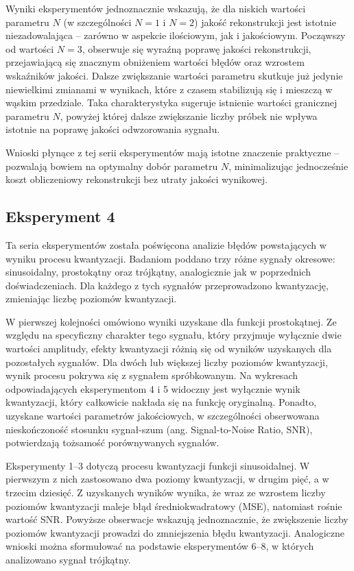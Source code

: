 \documentclass{article}
\begin{document}
    Wyniki eksperymentów jednoznacznie wskazują, że dla niskich wartości parametru \(N\) (w 
    szczególności \(N = 1\) i \(N = 2\)) jakość rekonstrukcji jest istotnie niezadowalająca 
    – zarówno w aspekcie ilościowym, jak i jakościowym. Począwszy od wartości 
    \(N = 3\), obserwuje się wyraźną poprawę jakości rekonstrukcji, przejawiającą się znacznym 
    obniżeniem wartości błędów oraz wzrostem wskaźników jakości. Dalsze zwiększanie wartości 
    parametru skutkuje już jedynie niewielkimi zmianami w wynikach, które z czasem stabilizują się 
    i mieszczą w wąskim przedziale. Taka charakterystyka sugeruje istnienie wartości granicznej parametru 
    \(N\), powyżej której dalsze zwiększanie liczby próbek nie wpływa istotnie 
    na poprawę jakości odwzorowania sygnału.

    Wnioski płynące z tej serii eksperymentów mają istotne znaczenie praktyczne – pozwalają 
    bowiem na optymalny dobór parametru 
    \(N\), minimalizując jednocześnie koszt obliczeniowy rekonstrukcji bez utraty jakości wynikowej.

    \subsection{Eksperyment 4}
    Ta seria eksperymentów została poświęcona analizie błędów powstających w wyniku procesu kwantyzacji. 
    Badaniom poddano trzy różne sygnały okresowe: sinusoidalny, prostokątny oraz trójkątny, analogicznie
    jak w poprzednich doświadczeniach. Dla każdego z tych sygnałów przeprowadzono kwantyzację, zmieniając 
    liczbę poziomów kwantyzacji.

    W pierwszej kolejności omówiono wyniki uzyskane dla funkcji prostokątnej. Ze względu na specyficzny 
    charakter tego sygnału, który przyjmuje wyłącznie dwie wartości amplitudy, efekty kwantyzacji różnią
    się od wyników uzyskanych dla pozostałych sygnałów. Dla dwóch lub większej liczby poziomów kwantyzacji,
    wynik procesu pokrywa się z sygnałem spróbkowanym. Na wykresach odpowiadających eksperymentom 4 i 5 
    widoczny jest wyłącznie wynik kwantyzacji, który całkowicie nakłada się na funkcję oryginalną. Ponadto, 
    uzyskane wartości parametrów jakościowych, w szczególności obserwowana nieskończoność stosunku sygnał-szum
    (ang. Signal-to-Noise Ratio, SNR), potwierdzają tożsamość porównywanych sygnałów.

    Eksperymenty 1–3 dotyczą procesu kwantyzacji funkcji sinusoidalnej. W pierwszym z nich zastosowano 
    dwa poziomy kwantyzacji, w drugim pięć, a w trzecim dziesięć. Z uzyskanych wyników wynika, że wraz 
    ze wzrostem liczby poziomów kwantyzacji maleje błąd średniokwadratowy (MSE), natomiast rośnie wartość
    SNR. Powyższe obserwacje wskazują jednoznacznie, że zwiększenie liczby poziomów kwantyzacji 
    prowadzi do zmniejszenia błędu kwantyzacji. Analogiczne wnioski można sformułować na podstawie 
    eksperymentów 6–8, w których analizowano sygnał trójkątny.
\end{document}
